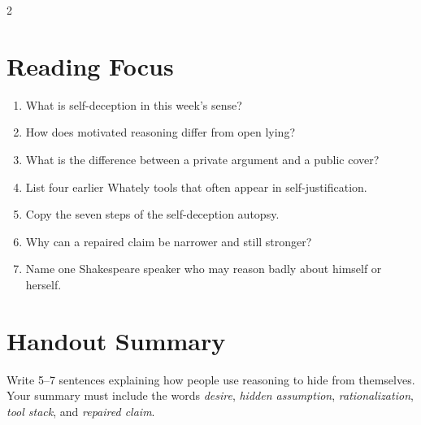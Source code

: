 \documentclass[12pt]{article}
\begin{document}
\begin{multicols}{2}
\section*{Reading Focus}
\begin{enumerate}[leftmargin=*]
\item What is self-deception in this week's sense?
\item How does motivated reasoning differ from open lying?
\item What is the difference between a private argument and a public cover?
\item List four earlier Whately tools that often appear in self-justification.
\item Copy the seven steps of the self-deception autopsy.
\item Why can a repaired claim be narrower and still stronger?
\item Name one Shakespeare speaker who may reason badly about himself or herself.
\end{enumerate}

\section*{Handout Summary}
Write 5--7 sentences explaining how people use reasoning to hide from themselves. Your summary must include the words \textit{desire}, \textit{hidden assumption}, \textit{rationalization}, \textit{tool stack}, and \textit{repaired claim}.
\end{multicols}
\end{document}
